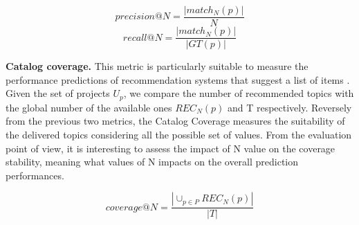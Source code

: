 
\begin{equation} \label{eqn:Precision}
precision@N = \frac{ \left | match_{N}(p) \right | }{N}
\end{equation}
\begin{equation} \label{eqn:Recall}
recall@N = \frac{ \left | match_{N}(p) \right | }{\left | GT(p) \right |}
\end{equation}

\vspace{.1cm}
\vspace{.1cm}



\noindent \textbf{Catalog coverage.} This metric is particularly suitable to measure the performance predictions of recommendation systems that suggest a list of items \cite{ge_beyond_2010}. Given the set of projects $U_p$, we compare the number of recommended topics with the global number of the available ones \ie $ REC_{N}(p)$ and T respectively. Reversely from the previous two metrics, the Catalog Coverage measures the suitability of the delivered topics considering all the possible set of values. From the evaluation point of view, it is interesting to assess the impact of N value on the coverage stability, meaning what values of N impacts on the overall prediction performances. 



\begin{equation}\label{eqn:Coverage}
coverage@N = \frac{\left | \cup_{p\in P} REC_{N}(p) \right | }{\left | T \right |} 
\end{equation}

\vspace{.1cm}
\vspace{.1cm}





